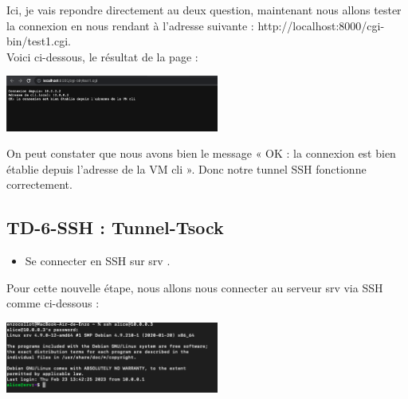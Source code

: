 \documentclass[12pt]{article}
\begin{document}
\vspace{0.3cm}

Ici, je vais repondre directement au deux question, maintenant nous allons tester la connexion en nous rendant à l'adresse suivante : http://localhost:8000/cgi-bin/test1.cgi. \\

Voici ci-dessous, le résultat de la page : 

\vspace{0.3cm}

\begin{center}
  \includegraphics[width=7cm]{Image-TD-SSH-5/Connexion-Cli.png}
\end{center}

\vspace{0.3cm}

On peut constater que nous avons bien le message « OK : la connexion est bien établie depuis l’adresse de la VM cli ». Donc notre tunnel SSH fonctionne correctement.

\newpage

\subsection{TD-6-SSH : Tunnel-Tsock}

\vspace{0.3cm}

\begin{itemize}
  \item Se connecter en SSH sur srv .
\end{itemize}

\vspace{0.3cm}

Pour cette nouvelle étape, nous allons nous connecter au serveur srv via SSH comme ci-dessous  : 

\vspace{0.3cm}

\begin{center}
  \includegraphics[width=7cm]{Image-TD-SSH-6/connexion-ssh-srv.png}
\end{center}
\end{document}
